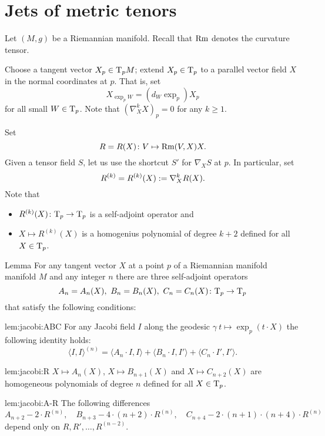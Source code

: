 \documentclass[a4paper,10pt]{article}
\begin{document}
  
\section{Jets of metric tenors}

Let $(M,g)$ be a Riemannian manifold.
Recall that $\operatorname{Rm}$ denotes the curvature tensor.

Choose a tangent vector $X_p\in \mathrm{T}_pM$; 
extend $X_p\in \mathrm{T}_p$ to a parallel vector field $X$ in the normal coordinates at $p$.
That is, set 
\[X_{\exp_pW}=(d_W\exp_p)X_p\] for all small $W\in \mathrm{T}_p$.
Note that $(\nabla^k_X X)_p=0$ for any $k\ge 1$.

Set 
\[R=R(X)\colon V\mapsto \operatorname{Rm}(V,X)X.\]
Given a tensor field $S$, let us use the shortcut $S'$  for $\nabla_XS$ at $p$.
In particular, set
\[R^{(k)}=R^{(k)}(X)\mathrel{{:}{=}}\nabla^k_XR(X).\]
Note that 
\begin{itemize}
\item $R^{(k)}(X)\colon\mathrm{T}_p\to\mathrm{T}_p$ is a self-adjoint operator and
\item $X\mapsto R^{(k)}(X)$ is a homogenius polynomial of degree $k+2$ defined for all $X\in \mathrm{T}_p$.
\end{itemize}

 


\begin{thm}{Lemma}\label{lem:jacobi}
For any tangent vector $X$ at a point $p$ of a Riemannian manifold manifold $M$ and any integer $n$ there are three self-adjoint operators 
\[A_n=A_n(X),\ B_n=B_n(X),\ C_n=C_n(X)\colon\mathrm{T}_p\to \mathrm{T}_p\]
that satisfy the following conditions:

\begin{subthm}{lem:jacobi:ABC}
For any Jacobi field $I$ along the geodesic $\gamma\:t\mapsto \exp_p(t\cdot X)$ the following identity holds:
\[\langle I,I\rangle^{(n)}
=
\langle A_n\cdot  I,I\rangle+ \langle B_n\cdot I, I'\rangle+\langle C_n\cdot I', I'\rangle.\]
\end{subthm}

\begin{subthm}{lem:jacobi:R}
 $X\mapsto A_{n}(X)$, $X\mapsto B_{n+1}(X)$ and $X\mapsto C_{n+2}(X)$ are homogeneous polynomials of degree $n$ defined for all $X\in \mathrm{T}_p$.
\end{subthm}

\begin{subthm}{lem:jacobi:A-R}
The following differences  
\[A_{n+2}-2\cdot R^{(n)},
\quad 
B_{n+3}-4\cdot(n+2)\cdot R^{(n)},
\quad
C_{n+4}-2\cdot(n+1)\cdot(n+4)\cdot R^{(n)}\]
depend only on $R,R',\dots, R^{(n-2)}$.
\end{subthm}


\end{thm}
\end{document}
